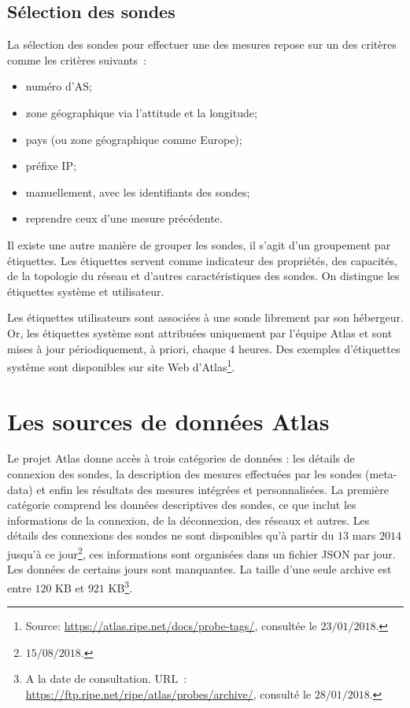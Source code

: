\subsection{Sélection des sondes}
La sélection des sondes   pour effectuer une des mesures repose sur un des critères comme les critères suivants~: 
\begin{itemize}
	\item numéro d'AS;
	\item zone géographique via  l'attitude et la longitude;
	\item pays (ou zone géographique comme  Europe);
	\item préfixe IP; %
	\item manuellement, avec les identifiants des sondes;
	\item reprendre ceux d'une  mesure précédente.
\end{itemize}

Il existe une autre manière de grouper les sondes, il s'agit d'un groupement  par étiquettes.  Les étiquettes servent comme indicateur des propriétés, des capacités, de la topologie du réseau et d'autres caractéristiques des sondes. On distingue les étiquettes système  et utilisateur. %

Les étiquettes utilisateurs sont  associées à une sonde librement par son hébergeur. Or, les étiquettes système sont attribuées uniquement par l'équipe  Atlas et sont mises à jour périodiquement, à priori, chaque $4$ heures. Des exemples d'étiquettes système sont disponibles sur site Web  d'Atlas\footnote{Source: \url{https://atlas.ripe.net/docs/probe-tags/}, consultée le $23/01/2018$.}.

\section{Les sources de données Atlas} \label{subsec:sources-data}

Le projet Atlas donne accès à trois catégories de données : les détails de connexion des sondes, la description des mesures effectuées par les sondes (meta-data) et enfin
les résultats des mesures intégrées et personnalisées.
La première catégorie comprend  les données descriptives des  sondes, ce que inclut
les informations de la connexion, de la déconnexion, des réseaux et autres. Les détails des connexions des sondes ne sont disponibles qu'à partir du  $13$ mars $2014$ jusqu'à ce jour\footnote{$15/08/2018$.}, ces informations sont organisées dans un fichier JSON par jour.
Les données de certains jours sont manquantes. La taille d'une seule archive est entre $120 $ KB et $921$ KB\footnote{A la date de consultation.  URL~: \url{https://ftp.ripe.net/ripe/atlas/probes/archive/}, consulté le $ 28/01/2018 $.}. 

